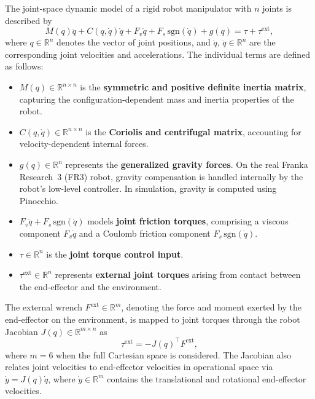 \documentclass[
	german,%
	accentcolor=9c,%
	ruledheaders=section,%
	class=report,%
	thesis={type=bachelor},%
	fontsize=11pt,%
	parskip=half-,%
	custommargins=true,%
	marginpar=false,%
]{tudapub}
\begin{document}
The joint-space dynamic model of a rigid robot manipulator with $n$ joints is described by
\begin{equation}
    M(q)\ddot{q} + C(q,\dot{q})\dot{q} + F_v\dot{q} + F_s\,\text{sgn}(\dot{q}) + g(q) = \tau + \tau^{\text{ext}},
    \label{eq:joint_dynamics}
\end{equation}
where $q \in \mathbb{R}^{n}$ denotes the vector of joint positions, and $\dot{q},\,\ddot{q} \in \mathbb{R}^{n}$ are the corresponding joint velocities and accelerations. The individual terms are defined as follows:
\begin{itemize}
    \item $M(q) \in \mathbb{R}^{n \times n}$ is the \textbf{symmetric and positive definite inertia matrix}, capturing the configuration-dependent mass and inertia properties of the robot.
    \item $C(q,\dot{q}) \in \mathbb{R}^{n \times n}$ is the \textbf{Coriolis and centrifugal matrix}, accounting for velocity-dependent internal forces.
    \item $g(q) \in \mathbb{R}^{n}$ represents the \textbf{generalized gravity forces}. On the real Franka Research~3 (FR3) robot, gravity compensation is handled internally by the robot's low-level controller. In simulation, gravity is computed using Pinocchio.
    \item $F_v\dot{q} + F_s\,\text{sgn}(\dot{q})$ models \textbf{joint friction torques}, 
    comprising a viscous component $F_v\dot{q}$ and a Coulomb friction component 
    $F_s\,\text{sgn}(\dot{q})$.
    \item $\tau \in \mathbb{R}^{n}$ is the \textbf{joint torque control input}.
    \item $\tau^{\text{ext}} \in \mathbb{R}^{n}$ represents \textbf{external joint torques} arising from contact between the end-effector and the environment.
\end{itemize}

The external wrench $F^{\text{ext}} \in \mathbb{R}^{m}$, denoting the force and moment exerted by the end-effector on the environment, is mapped to joint torques through the robot Jacobian $J(q) \in \mathbb{R}^{m \times n}$ as
\begin{equation}
    \tau^{\text{ext}} = -J(q)^\top F^{\text{ext}},
    \label{eq:ext_torque}
\end{equation}
where $m = 6$ when the full Cartesian space is considered. The Jacobian also relates joint velocities to end-effector velocities in operational space via $\dot{y} = J(q)\dot{q}$, where $\dot{y} \in \mathbb{R}^{m}$ contains the translational and rotational end-effector velocities.
\end{document}
